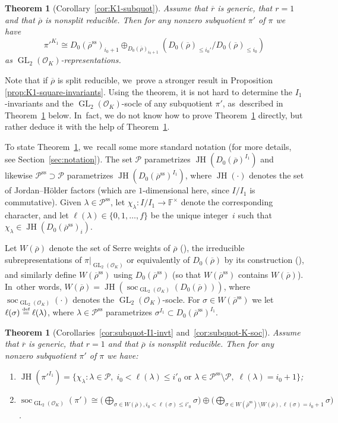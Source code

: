 \documentclass[JEP,XML,SOM,Unicode,NoFloatCountersInSection, NoEqCountersInSection,published]{cedram}
\newcommand{\defeq}{\stackrel{\textrm{\tiny{\upshape{def}}}}{=}}
\newcommand{\F}{\mathbb{F}}
\newcommand{\cO}{\mathcal{O}}
\renewcommand{\P}{\mathscr P}
\renewcommand{\ss}{\mathrm{ss}}
\newcommand{\rbar}{\overline{r}}
\newcommand{\rhobar}{\overline{\rho}}
\newcommand{\brho}{\overline{\rho}}
\newcommand{\s}{^\times}
\DeclareMathOperator{\GL}{GL}
\DeclareMathOperator{\JH}{\mathrm{JH}}
\DeclareMathOperator{\soc}{soc}
\theoremstyle{plain}
\newtheorem{thm}[prop]{Theorem}
\theoremstyle{definition}
\begin{document}
\begin{thm}[Corollary~\ref{cor:K1-subquot}]\label{thm:intro-pi'-K1}
Assume that $\rbar$ is generic, that $r=1$ and that $\rhobar$ is nonsplit reducible.
Then for any nonzero subquotient $\pi'$ of $\pi$ we have
\[
\pi'^{K_1} \cong D_0(\brho^\ss)_{i_0+1} \oplus_{D_0(\brho)_{i_0+1}} (D_0(\brho)_{\le i_0'}/D_0(\brho)_{\le i_0})
\]
as $\GL_2(\cO_K)$-representations.
\end{thm}

Note that if $\brho$ is split reducible, we~prove a stronger result in Proposition \ref{prop:K1-square-invariants}.
Using the theorem, it is not hard to determine the $I_1$-invariants and the $\GL_2(\cO_K)$-socle of any subquotient $\pi'$, as~described in Theorem~\ref{thm:intro-structure-pi'} below. In~fact, we do not know how to prove Theorem~\ref{thm:intro-pi'-K1} directly, but rather deduce it with the help of Theorem~\ref{thm:intro-structure-pi'}.

To state Theorem~\ref{thm:intro-structure-pi'}, we~recall some more standard notation (for more details, see Section~\ref{sec:notation}).
The set $\P$ parametrizes $\JH(D_0(\brho)^{I_1})$ and likewise \hbox{$\P^\ss \supset \P$} parametrizes $\JH(D_0(\brho^\ss)^{I_1})$, where $\JH(\cdot)$ denotes the set of Jordan--Hölder factors (which are $1$\nobreakdash-dimensional here, since $I/I_1$ is commutative).
Given $\lambda \in \P^\ss$, let \hbox{$\chi_\lambda: I/I_1 \to \F\s$} denote the corresponding character, and let $\ell(\lambda) \in \{0,1,\dots,f\}$ be the unique integer~$i$ such that $\chi_\lambda \in \JH(D_0(\brho^\ss)_i)$.

Let $W(\brho)$ denote the set of Serre weights of $\brho$ (\cf \cite{BDJ}), \ie the irreducible subrepresentations of $\pi|_{\GL_2(\cO_K)}$ or equivalently of $D_0(\brho)$ by its construction (\cite[\S 12]{BP}), and similarly define $W(\brho^\ss)$ using $D_0(\brho^\ss)$ (so that $W(\brho^\ss)$ contains $W(\brho)$). In~other words, $W(\brho) = \JH(\soc_{\GL_2(\cO_K)}(D_0(\brho)))$, where $\soc_{\GL_2(\cO_K)}(\cdot)$ denotes the $\GL_2(\cO_K)$-socle.
For $\sigma \in W(\brho^\ss)$ we let $\ell(\sigma) \defeq \ell(\lambda)$, where $\lambda \in \P^\ss$ parametrizes $\sigma^{I_1} \subset D_0(\brho^\ss)^{I_1}$.

\begin{thm}[Corollaries~\ref{cor:subquot-I1-invt} and~\ref{cor:subquot-K-soc}]\label{thm:intro-structure-pi'}
Assume that $\rbar$ is generic, that $r=1$ and that $\rhobar$ is nonsplit reducible.
Then for any nonzero subquotient $\pi'$ of $\pi$ we have:
\begin{enumerate}
\item\label{thm:intro-structure-pi'i} $\JH(\pi'^{I_1}) = \big\{ \chi_\lambda: \text{$\lambda \in \P,\; i_0 < \ell(\lambda) \le i'_0$ or $\lambda \in \P^\ss \setminus \P,\; \ell(\lambda) = i_0+1$} \big\}$;
\item\label{thm:intro-structure-pi'ii} $\soc_{\GL_2(\cO_K)}(\pi') \cong \bigl(\bigoplus_{\sigma \in W(\brho), i_0 < \ell(\sigma) \le i'_0} \sigma\bigr) \oplus \bigl(\bigoplus_{\sigma \in W(\brho^\ss) \setminus W(\brho), \ell(\sigma) = i_0+1} \sigma\bigr)$.
\end{enumerate}
\end{thm}
\end{document}
